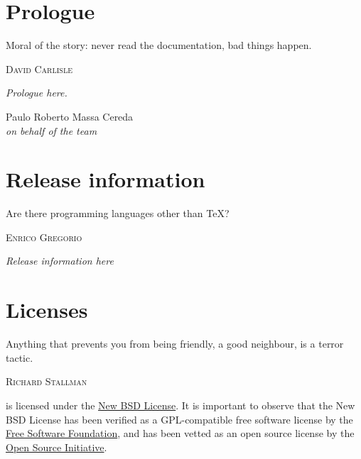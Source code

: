\documentclass[a4paper,twoside,12pt]{memoir}
\begin{document}
\chapter*{Prologue}
\label{chap:prologue}

\epigraph{Moral of the story: never read the documentation, bad things happen.}{\textsc{David Carlisle}}

\emph{Prologue here.}

\vfill

\begin{flushright}
Paulo Roberto Massa Cereda\\
\emph{on behalf of the \arara team}
\end{flushright}

\chapter*{Release information}
\label{chap:releaseinformation}

\epigraph{Are there programming languages other than \TeX?}{\textsc{Enrico Gregorio}}

\emph{Release information here}

\chapter*{Licenses}
\label{chap:licenses}

\epigraph{Anything that prevents you from being friendly, a good neighbour, is a terror tactic.}{\textsc{Richard Stallman}}

\noindent\arara is licensed under the \href{http://www.opensource.org/licenses/bsd-license.php}{New BSD License}. It is important to observe that the New BSD License has been verified as a GPL-compatible free software license by the \href{http://www.fsf.org/}{Free Software Foundation}, and has been vetted as an open source license by the \href{http://www.opensource.org/}{Open Source Initiative}.
\end{document}
